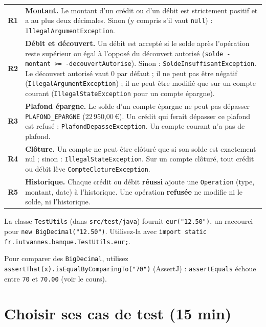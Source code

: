 \documentclass[11pt]{article}
\begin{document}
\begin{center}
\renewcommand{\arraystretch}{1.3}
\begin{tabular}{@{}>{\bfseries\color{qaaccentdark}}l p{14cm}@{}}
\toprule
R1 & \textbf{Montant.} Le montant d'un crédit ou d'un débit est strictement positif et a au plus deux décimales. Sinon (y compris s'il vaut \texttt{null}) : \texttt{IllegalArgumentException}. \\
R2 & \textbf{Débit et découvert.} Un débit est accepté si le solde après l'opération reste supérieur ou égal à l'opposé du découvert autorisé (\texttt{solde - montant >= -decouvertAutorise}). Sinon : \texttt{SoldeInsuffisantException}. Le découvert autorisé vaut 0 par défaut ; il ne peut pas être négatif (\texttt{IllegalArgumentException}) ; il ne peut être modifié que sur un compte courant (\texttt{IllegalStateException} pour un compte épargne). \\
R3 & \textbf{Plafond épargne.} Le solde d'un compte épargne ne peut pas dépasser \texttt{PLAFOND\_EPARGNE} (22\,950,00\,\euro{}). Un crédit qui ferait dépasser ce plafond est refusé : \texttt{PlafondDepasseException}. Un compte courant n'a pas de plafond. \\
R4 & \textbf{Clôture.} Un compte ne peut être clôturé que si son solde est exactement nul ; sinon : \texttt{IllegalStateException}. Sur un compte clôturé, tout crédit ou débit lève \texttt{CompteClotureException}. \\
R5 & \textbf{Historique.} Chaque crédit ou débit \textbf{réussi} ajoute une \texttt{Operation} (type, montant, date) à l'historique. Une opération \textbf{refusée} ne modifie ni le solde, ni l'historique. \\
\bottomrule
\end{tabular}
\end{center}

\begin{infobox}
La classe \texttt{TestUtils} (dans \texttt{src/test/java}) fournit \texttt{eur("12.50")}, un raccourci pour \texttt{new BigDecimal("12.50")}. Utilisez-la avec \texttt{import static fr.iutvannes.banque.TestUtils.eur;}.

Pour comparer des \texttt{BigDecimal}, utilisez \texttt{assertThat(x).isEqualByComparingTo("70")} (AssertJ) : \texttt{assertEquals} échoue entre \texttt{70} et \texttt{70.00} (voir le cours).
\end{infobox}

\section{Choisir ses cas de test (15 min)}
\end{document}
